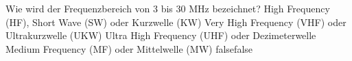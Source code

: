     {Wie wird der Frequenzbereich von 3 bis 30 MHz bezeichnet?}
    {High Frequency (HF), Short Wave (SW) oder Kurzwelle (KW)}
    {Very High Frequency (VHF) oder Ultrakurzwelle (UKW)}
    {Ultra High Frequency (UHF) oder Dezimeterwelle}
    {Medium Frequency (MF) oder Mittelwelle (MW)}
    {false}{false}